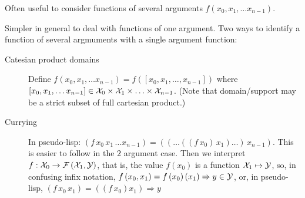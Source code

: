 \label{sec:Multiple-arguments}

Often useful to consider 
functions of several arguments
$f \left( x_0, x_1, \ldots x_{n-1}\right)$.

Simpler in general to deal with functions of one argument.
Two ways to identify a function of several argmuments
with a single argument function:
\begin{description}
\item[Catesian product domains]
Define $f \left( x_0, x_1, \ldots x_{n-1} \right) 
= f \left( \left[x_0, x_1, \ldots , x_{n-1} \right]\right)$
where $\left[x_0, x_1, \ldots x_{n-1} \right] \in
\mathcal{X}_0 \times \mathcal{X}_1 \times \ldots \times \mathcal{X}_{n-1}$. 
(Note that domain/support may be a strict subset of full cartesian 
product.)
\item[Currying]
In pseudo-lisp: $\left(f \, x_0 \, x_1 \, \ldots x_{n-1} \right) 
= 
\left(
\left(
\ldots 
\left( 
\left( 
f 
\, x_0 
\right) 
\, x_1
\right) 
\ldots 
\right) 
\, x_{n-1}
\right) 
$.
This is easier to follow in the $2$ argument case.
Then we interpret $f : \mathcal{X}_0 \rightarrow 
\mathcal{F}\left(\mathcal{X}_1, \mathcal{Y} \right)$,
that is, the value $f \left( x_0 \right)$ is a function 
$\mathcal{X}_1 \mapsto \mathcal{Y}$,
so, in confusing infix notation,
$f \left( x_0 , x_1 \right) = 
f \left( x_0 \right) \left( x_1 \right) \Rightarrow y \in \mathcal{Y}$,
or, in pseudo-lisp, 
$\left( f \, x_0 \, x_1 \right) = \left( \left( f \, x_0 \right) x_1 \right) \Rightarrow y$
\end{description}




